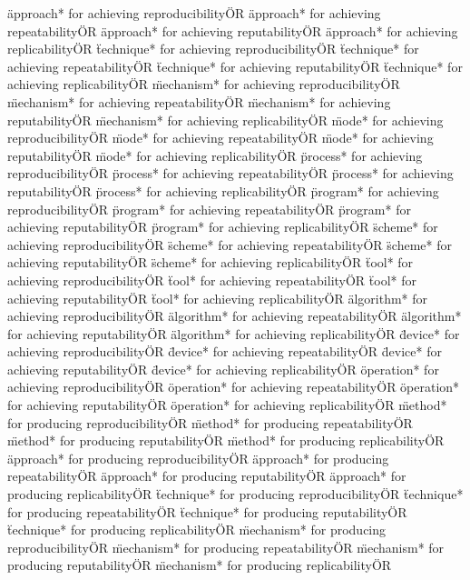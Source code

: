 \documentclass[
10pt, %
a4paper, %
oneside, %
headinclude,footinclude, %
BCOR5mm, %
]{scrartcl}
\begin{document}
\"approach* for achieving reproducibility\" OR \"approach* for achieving repeatability\" OR \"approach* for achieving reputability\" OR \"approach* for achieving replicability\" OR 
\"technique* for achieving reproducibility\" OR \"technique* for achieving repeatability\" OR \"technique* for achieving reputability\" OR \"technique* for achieving replicability\" OR 
\"mechanism* for achieving reproducibility\" OR \"mechanism* for achieving repeatability\" OR \"mechanism* for achieving reputability\" OR \"mechanism* for achieving replicability\" OR 
\"mode* for achieving reproducibility\" OR \"mode* for achieving repeatability\" OR \"mode* for achieving reputability\" OR \"mode* for achieving replicability\" OR 
\"process* for achieving reproducibility\" OR \"process* for achieving repeatability\" OR \"process* for achieving reputability\" OR \"process* for achieving replicability\" OR 
\"program* for achieving reproducibility\" OR \"program* for achieving repeatability\" OR \"program* for achieving reputability\" OR \"program* for achieving replicability\" OR 
\"scheme* for achieving reproducibility\" OR \"scheme* for achieving repeatability\" OR \"scheme* for achieving reputability\" OR \"scheme* for achieving replicability\" OR 
\"tool* for achieving reproducibility\" OR \"tool* for achieving repeatability\" OR \"tool* for achieving reputability\" OR \"tool* for achieving replicability\" OR 
\"algorithm* for achieving reproducibility\" OR \"algorithm* for achieving repeatability\" OR \"algorithm* for achieving reputability\" OR \"algorithm* for achieving replicability\" OR 
\"device* for achieving reproducibility\" OR \"device* for achieving repeatability\" OR \"device* for achieving reputability\" OR \"device* for achieving replicability\" OR 
\"operation* for achieving reproducibility\" OR \"operation* for achieving repeatability\" OR \"operation* for achieving reputability\" OR \"operation* for achieving replicability\" OR 
\"method* for producing reproducibility\" OR \"method* for producing repeatability\" OR \"method* for producing reputability\" OR \"method* for producing replicability\" OR 
\"approach* for producing reproducibility\" OR \"approach* for producing repeatability\" OR \"approach* for producing reputability\" OR \"approach* for producing replicability\" OR 
\"technique* for producing reproducibility\" OR \"technique* for producing repeatability\" OR \"technique* for producing reputability\" OR \"technique* for producing replicability\" OR 
\"mechanism* for producing reproducibility\" OR \"mechanism* for producing repeatability\" OR \"mechanism* for producing reputability\" OR \"mechanism* for producing replicability\" OR 
\end{document}
